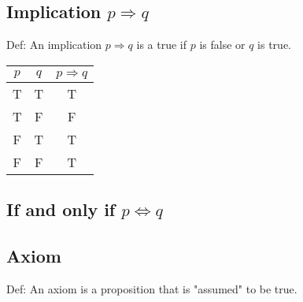 \documentclass[12pt]{article}
\begin{document}
\subsection*{Implication $p \Rightarrow q$} 
Def: An implication $p \Rightarrow q$ is a true if $p$ is false or $q$ is true.

\begin{tabular}{|c|c|c|}
\hline
$p$ & $q$ & $p \Rightarrow q$ \\
\hline
T & T & T \\
T & F & F \\
F & T & T \\
F & F & T \\
\hline
\end{tabular}

\subsection*{If and only if $p \Leftrightarrow q$}

\subsection*{Axiom}
Def: An axiom is a proposition that is "assumed" to be true.
\end{document}

